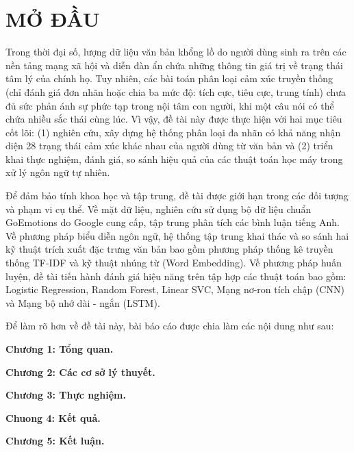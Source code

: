 
\chapter*{MỞ ĐẦU} %

\label{Chapter0} %


Trong thời đại số, lượng dữ liệu văn bản khổng lồ do người dùng sinh ra trên các nền tảng mạng xã hội và diễn đàn ẩn chứa những thông tin giá trị về trạng thái tâm lý của chính họ. Tuy nhiên, các bài toán phân loại cảm xúc truyền thống (chỉ đánh giá đơn nhãn hoặc chia ba mức độ: tích cực, tiêu cực, trung tính) chưa đủ sức phản ánh sự phức tạp trong nội tâm con người, khi một câu nói có thể chứa nhiều sắc thái cùng lúc. Vì vậy, đề tài này được thực hiện với hai mục tiêu cốt lõi: (1) nghiên cứu, xây dựng hệ thống phân loại đa nhãn có khả năng nhận diện 28 trạng thái cảm xúc khác nhau của người dùng từ văn bản và (2) triển khai thực nghiệm, đánh giá, so sánh hiệu quả của các thuật toán học máy trong xử lý ngôn ngữ tự nhiên.
 
Để đảm bảo tính khoa học và tập trung, đề tài được giới hạn trong các đối tượng và phạm vi cụ thể. Về mặt dữ liệu, nghiên cứu sử dụng bộ dữ liệu chuẩn GoEmotions do Google cung cấp, tập trung phân tích các bình luận tiếng Anh. Về phương pháp biểu diễn ngôn ngữ, hệ thống tập trung khai thác và so sánh hai kỹ thuật trích xuất đặc trưng văn bản bao gồm phương pháp thống kê truyền thống TF-IDF và kỹ thuật nhúng từ (Word Embedding). Về phương pháp huấn luyện, đề tài tiến hành đánh giá hiệu năng trên tập hợp các thuật toán bao gồm: Logistic Regression, Random Forest, Linear SVC,  Mạng nơ-ron tích chập (CNN) và Mạng bộ nhớ dài - ngắn (LSTM).

Để làm rõ hơn về đề tài này, bài báo cáo được chia làm các nội dung như sau:

\textbf{Chương 1: Tổng quan.}

\textbf{Chương 2: Các cơ sở lý thuyết.}

\textbf{Chương 3: Thực nghiệm.}

\textbf{Chuong 4: Kết quả.}

\textbf{Chương 5: Kết luận.}